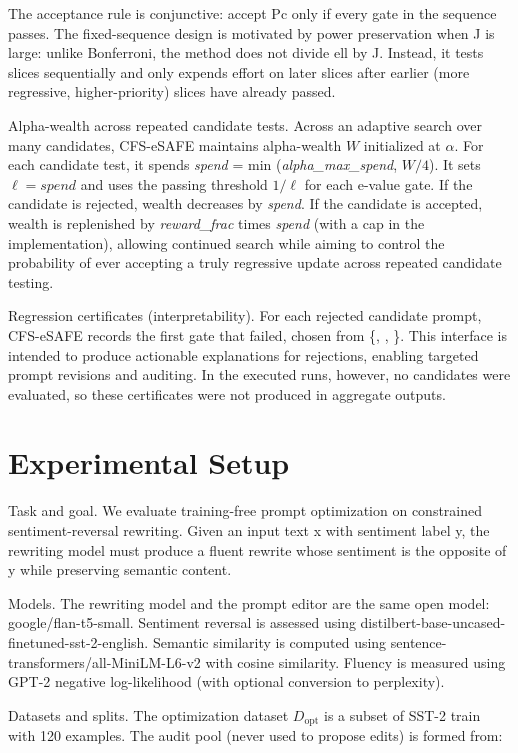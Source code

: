 \documentclass{article} %
\begin{document}
The acceptance rule is conjunctive: accept Pc only if every gate in the sequence passes. The fixed-sequence design is motivated by power preservation when J is large: unlike Bonferroni, the method does not divide ell by J. Instead, it tests slices sequentially and only expends effort on later slices after earlier (more regressive, higher-priority) slices have already passed.

Alpha-wealth across repeated candidate tests. Across an adaptive search over many candidates, CFS-eSAFE maintains alpha-wealth $W$ initialized at $\alpha$. For each candidate test, it spends \textit{spend} = min (\textit{alpha\_max\_spend}, $W/4$). It sets $\ell = \textit{spend}$ and uses the passing threshold $1/\ell$ for each e-value gate. If the candidate is rejected, wealth decreases by \textit{spend}. If the candidate is accepted, wealth is replenished by \textit{reward\_frac} times \textit{spend} (with a cap in the implementation), allowing continued search while aiming to control the probability of ever accepting a truly regressive update across repeated candidate testing.

Regression certificates (interpretability). For each rejected candidate prompt, CFS-eSAFE records the first gate that failed, chosen from \{, , \}. This interface is intended to produce actionable explanations for rejections, enabling targeted prompt revisions and auditing. In the executed runs, however, no candidates were evaluated, so these certificates were not produced in aggregate outputs.

\section{Experimental Setup}\label{sec:experimental}
Task and goal. We evaluate training-free prompt optimization on constrained sentiment-reversal rewriting. Given an input text x with sentiment label y, the rewriting model must produce a fluent rewrite whose sentiment is the opposite of y while preserving semantic content.

Models. The rewriting model and the prompt editor are the same open model: google/flan-t5-small. Sentiment reversal is assessed using distilbert-base-uncased-finetuned-sst-2-english. Semantic similarity is computed using sentence-transformers/all-MiniLM-L6-v2 with cosine similarity. Fluency is measured using GPT-2 negative log-likelihood (with optional conversion to perplexity).

Datasets and splits. The optimization dataset $D_{\text{opt}}$ is a subset of SST-2 train with 120 examples. The audit pool (never used to propose edits) is formed from:
\end{document}
